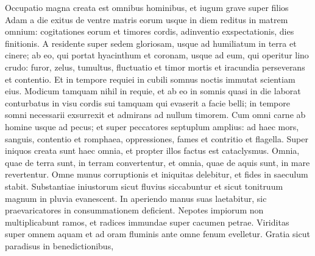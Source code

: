 \begin{biblechapter}
\begin{biblechapter}
\begin{biblechapter}
\begin{biblechapter}
\begin{biblechapter}
\begin{biblechapter}
\begin{biblechapter}
\begin{biblechapter}
\begin{biblechapter}
\begin{biblechapter}
\begin{biblechapter}
\begin{biblechapter}
\begin{biblechapter}
\begin{biblechapter}
\begin{biblechapter}
\begin{biblechapter}
\begin{biblechapter}
\begin{biblechapter}
\begin{biblechapter}
\begin{biblechapter}
\begin{biblechapter}
\begin{biblechapter}
\begin{biblechapter}
\begin{biblechapter}
\begin{biblechapter}
\begin{biblechapter}
\begin{biblechapter}
\begin{biblechapter}
\begin{biblechapter}
\begin{biblechapter}
\begin{biblechapter}
\begin{biblechapter}
\begin{biblechapter}
\begin{biblechapter}
\begin{biblechapter}
\begin{biblechapter}
\begin{biblechapter}
\begin{biblechapter}
\begin{biblechapter}
\begin{biblechapter}
\verse Occupatio magna creata est omnibus hominibus,
 et iugum grave super filios Adam
 a die exitus de ventre matris eorum
 usque in diem reditus in matrem omnium:
 \verse cogitationes eorum et timores cordis,
 adinventio exspectationis, dies finitionis.
 \verse A residente super sedem gloriosam,
 usque ad humiliatum in terra et cinere;
 \verse ab eo, qui portat hyacinthum et coronam,
 usque ad eum, qui operitur lino crudo:
 furor, zelus, tumultus, fluctuatio
 et timor mortis et iracundia perseverans et contentio.
 \verse Et in tempore requiei in cubili
 somnus noctis immutat scientiam eius.
 \verse Modicum tamquam nihil in requie,
 et ab eo in somnis quasi in die laborat
 \verse conturbatus in visu cordis sui
 tamquam qui evaserit a facie belli;
 in tempore somni necessarii exsurrexit
 et admirans ad nullum timorem.
 \verse Cum omni carne ab homine usque ad pecus;
 et super peccatores septuplum amplius:
 \verse ad haec mors, sanguis, contentio et romphaea,
 oppressiones, fames et contritio et flagella.
 \verse Super iniquos creata sunt haec omnia,
 et propter illos factus est cataclysmus.
 \verse Omnia, quae de terra sunt, in terram convertentur,
 et omnia, quae de aquis sunt, in mare revertentur.
 \verse Omne munus corruptionis et iniquitas delebitur,
 et fides in saeculum stabit.
 \verse Substantiae iniustorum sicut fluvius siccabuntur
 et sicut tonitruum magnum in pluvia evanescent.
 \verse In aperiendo manus suas laetabitur,
 sic praevaricatores in consummationem deficient.
 \verse Nepotes impiorum non multiplicabunt ramos,
 et radices immundae super cacumen petrae.
 \verse Viriditas super omnem aquam et ad oram fluminis
 ante omne fenum evelletur.
 \verse Gratia sicut paradisus in benedictionibus,

\end{biblechapter}
\end{biblechapter}
\end{biblechapter}
\end{biblechapter}
\end{biblechapter}
\end{biblechapter}
\end{biblechapter}
\end{biblechapter}
\end{biblechapter}
\end{biblechapter}
\end{biblechapter}
\end{biblechapter}
\end{biblechapter}
\end{biblechapter}
\end{biblechapter}
\end{biblechapter}
\end{biblechapter}
\end{biblechapter}
\end{biblechapter}
\end{biblechapter}
\end{biblechapter}
\end{biblechapter}
\end{biblechapter}
\end{biblechapter}
\end{biblechapter}
\end{biblechapter}
\end{biblechapter}
\end{biblechapter}
\end{biblechapter}
\end{biblechapter}
\end{biblechapter}
\end{biblechapter}
\end{biblechapter}
\end{biblechapter}
\end{biblechapter}
\end{biblechapter}
\end{biblechapter}
\end{biblechapter}
\end{biblechapter}
\end{biblechapter}
